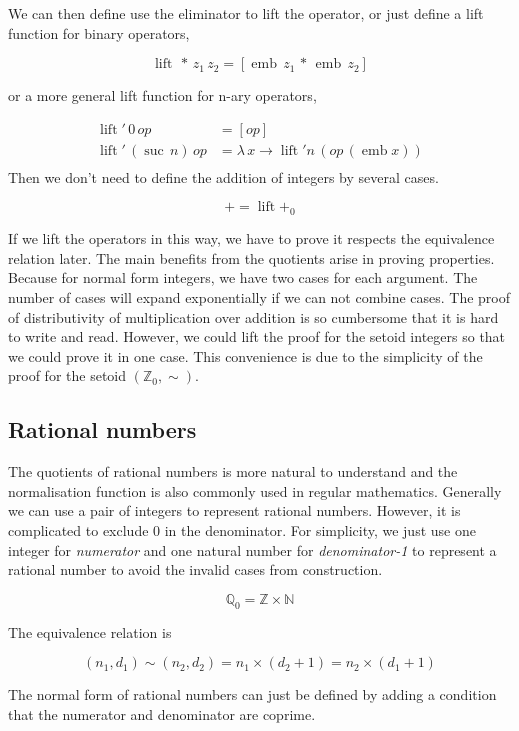 \documentclass[envcountsame]{llncs}
\newcommand{\N}{\mathbb{N}}
\newcommand{\Q}{\mathbb{Q}}
\newcommand{\Z}{\mathbb{Z}}
\providecommand{\class}[1]{[#1]}
\DeclareMathOperator{\emb}{emb}
\DeclareMathOperator{\lift}{lift}
\DeclareMathOperator{\suc}{suc\,}
\renewcommand{\equiv}{=}
\begin{document}
We can then define use the eliminator to lift the operator, or just define a lift function for binary operators,

$$ \lift \,* \,z_1 \,z_2 = \class{\emb \,z_1 \,*\,\emb \,z_2}$$

or a more general lift function for n-ary operators,



\begin{align*}
\lift' \,0 \,op &= \class{op}\\
\lift' \,(\suc n) \,op &= \lambda \,x \to \lift' n \,(op \,(\emb x))\\
\end{align*}
Then we don't need to define the addition of integers by several cases.

$$+ = \lift +_0$$

If we lift the operators in this way, we have to prove it respects the equivalence relation later. The main benefits from the quotients arise in proving properties. Because for normal form integers, we have two cases for each argument. The number of cases will expand exponentially if we can not combine cases. The proof of distributivity of multiplication over addition is so cumbersome
that it is hard to write and read. However, we could lift the proof for the setoid integers so that we could prove it in one case. This convenience is due to the simplicity of the proof for the setoid $(\Z_0,\sim)$. 

\subsection{Rational numbers}

The quotients of rational numbers is more natural to understand and the normalisation function is also commonly used in regular mathematics. Generally we can use a pair of integers to represent rational numbers. However, it is complicated to exclude 0 in the denominator. For simplicity, we just use one integer for \emph{numerator} and one natural number for \emph{denominator-1} to represent a rational number to avoid the invalid cases from construction. 

$$\Q_0 = \Z \times \N$$



The equivalence relation is

$$(n_1, d_1) \sim (n_2, d_2) = n_1 \times (d_2 + 1) \equiv n_2 \times (d_1 + 1) $$

The normal form of rational numbers can just be defined by adding a condition that the numerator and denominator are coprime.
\end{document}
